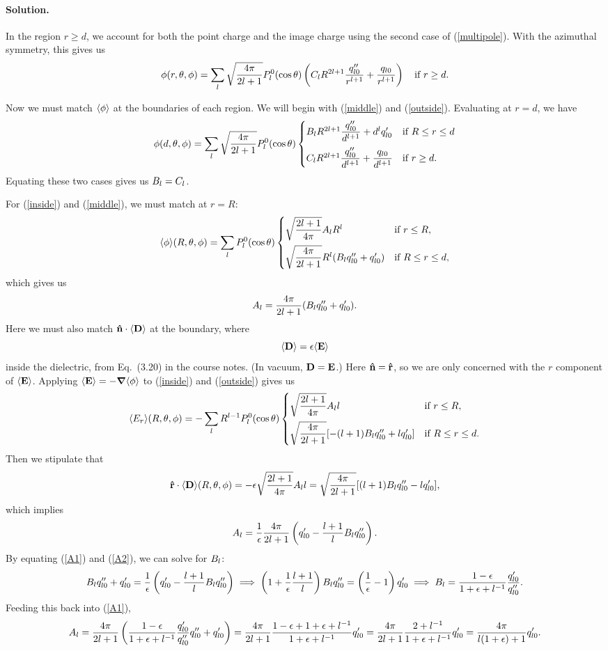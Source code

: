 \documentclass[11pt]{article}
\newcommand{\refeq}[1]{(\ref{#1})}
\newcommand{\beq}{\begin{equation*}}
\newcommand{\eeq}{\end{equation*}}
\newcommand{\beqn}{\begin{equation}}
\newcommand{\eeqn}{\end{equation}}
\newenvironment{solution}
{
    \paragraph{Solution.}
    \ignorespaces
}
{
    \bigskip
}
\begin{document}
\begin{solution}
	In the region $r \geq d$, we account for both the point charge and the image charge using the second case of \refeq{multipole}.  With the azimuthal symmetry, this gives us
	\beqn \label{outside}
		\phirtp = \sum_{l} \sqrt{\frac{4\pi}{2l+1}} \Ploct \left( \Cl R^{2l+1} \frac{\qpplo}{r^{l+1}} + \frac{\qlo}{r^{l+1}} \right) \quad \tif r \geq d.
	\eeqn
	
	Now we must match $\evphi$ at the boundaries of each region.  We will begin with \refeq{middle} and \refeq{outside}.  Evaluating at $r = d$, we have
	\beq
		\phi(d, \tht, \phi) = \sum_{l} \sqrt{\frac{4\pi}{2l+1}} \Ploct \begin{cases}
			\Bl R^{2l+1} \dfrac{\qpplo}{d^{l+1}} + d^l \qplo & \tif R \leq r \leq d \\[2ex]
			\Cl R^{2l+1} \dfrac{\qpplo}{d^{l+1}} + \dfrac{\qlo}{d^{l+1}} & \tif r \geq d.
		\end{cases}
	\eeq
	Equating these two cases gives us $B_l = C_l$.
	
	For \refeq{inside} and \refeq{middle}, we must match at $r = R$:
	\beq
		\evphi\!(R, \tht, \phi) = \sum_{l} \Ploct \begin{cases}
			\sqrt{\dfrac{2l + 1}{4\pi}} \Al R^l & \tif r \leq R, \\[2ex]
			\sqrt{\dfrac{4\pi}{2l+1}} R^l (\Bl \qpplo + \qplo) & \tif R \leq r \leq d,
		\end{cases}
	\eeq
	which gives us
	\beqn \label{A1}
		\Al = \frac{4\pi}{2l+1} (\Bl \qpplo + \qplo).
	\eeqn
	Here we must also match $\nh \cdot \evD$ at the boundary, where
	\beqn \label{D}
		\evD = \eps \!\evE
	\eeqn
	inside the dielectric, from Eq.~(3.20) in the course notes.  (In vacuum, $\vb{D} = \vb{E}$.)  Here $\vb{\hat{n}} = \vb{\hat{r}}$, so we are only concerned with the $r$ component of $\evE$.  Applying $\evE = -\grad\!\evphi$ to \refeq{inside} and \refeq{outside} gives us
	\beq
		\evEr\!(R, \tht, \phi) = -\sum_l R^{l-1} \Ploct \begin{cases}
			\sqrt{\dfrac{2l+1}{4\pi}} \Al l & \tif r \leq R, \\[2ex]
			\sqrt{\dfrac{4\pi}{2l+1}} [-(l + 1) \Bl \qpplo + l \qplo] & \tif R \leq r \leq d.
		\end{cases}
	\eeq
	Then we stipulate that
	\beq
		\rh \cdot \evD\!(R, \tht, \phi) = -\eps \sqrt{\frac{2l+1}{4\pi}} \Al l = \sqrt{\frac{4\pi}{2l+1}} [(l + 1) \Bl \qpplo - l \qplo],
	\eeq
	which implies
	\beqn \label{A2}
		\Al = \frac{1}{\eps} \frac{4\pi}{2l+1} \left( \qplo - \frac{l + 1}{l} \Bl \qpplo \right).
	\eeqn
	By equating \refeq{A1} and \refeq{A2}, we can solve for $B_l$:
	\beq
		\Bl \qpplo + \qplo = \frac{1}{\eps} \left( \qplo - \frac{l + 1}{l} \Bl \qpplo \right)
		\implies
		\left( 1 + \frac{1}{\eps} \frac{l + 1}{l} \right) \Bl \qpplo = \left( \frac{1}{\eps} - 1 \right) \qplo
		\implies
		\Bl = \frac{1 - \eps}{1 + \eps + l^{-1}} \frac{\qplo}{\qpplo}.
	\eeq
	Feeding this back into \refeq{A1},
	\beq
		\Al = \frac{4\pi}{2l+1} \left( \frac{1 - \eps}{1 + \eps + l^{-1}} \frac{\qplo}{\qpplo} \qpplo + \qplo \right)
		= \frac{4\pi}{2l+1} \frac{1 - \eps + 1 + \eps + l^{-1}}{1 + \eps + l^{-1}} \qplo
		= \frac{4\pi}{2l+1} \frac{2 + l^{-1}}{1 + \eps + l^{-1}} \qplo
		= \frac{4\pi}{l (1 + \eps) + 1} \qplo.
	\eeq
	

\end{solution}
\end{document}
